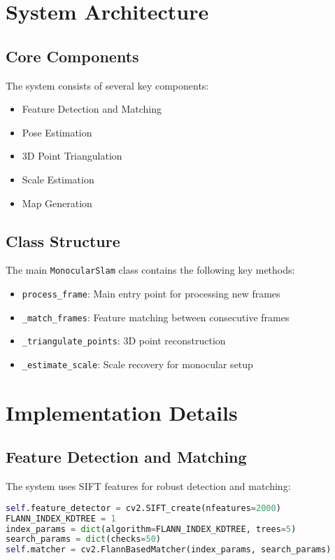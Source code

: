 \documentclass[11pt,a4paper]{article}
\begin{document}
\section{System Architecture}
\subsection{Core Components}
The system consists of several key components:
\begin{itemize}
    \item Feature Detection and Matching
    \item Pose Estimation
    \item 3D Point Triangulation
    \item Scale Estimation
    \item Map Generation
\end{itemize}

\subsection{Class Structure}
The main \texttt{MonocularSlam} class contains the following key methods:
\begin{itemize}
    \item \texttt{process\_frame}: Main entry point for processing new frames
    \item \texttt{\_match\_frames}: Feature matching between consecutive frames
    \item \texttt{\_triangulate\_points}: 3D point reconstruction
    \item \texttt{\_estimate\_scale}: Scale recovery for monocular setup
\end{itemize}

\section{Implementation Details}
\subsection{Feature Detection and Matching}
The system uses SIFT features for robust detection and matching:
\begin{lstlisting}[language=python]
self.feature_detector = cv2.SIFT_create(nfeatures=2000)
FLANN_INDEX_KDTREE = 1
index_params = dict(algorithm=FLANN_INDEX_KDTREE, trees=5)
search_params = dict(checks=50)
self.matcher = cv2.FlannBasedMatcher(index_params, search_params)
\end{lstlisting}
\end{document}
